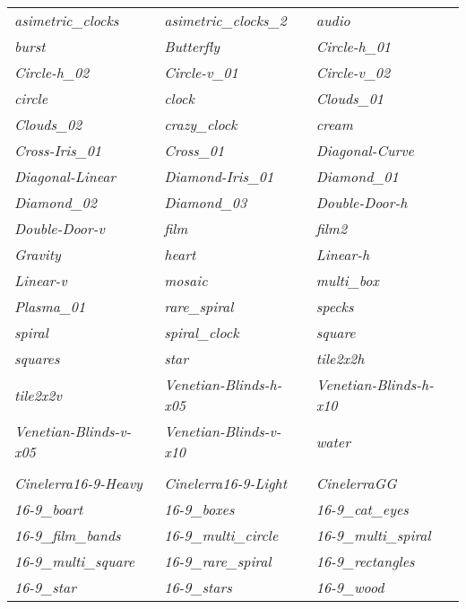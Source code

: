 \begin{center}
	\begin{longtable}{p{4cm}p{4cm}p{4cm}}
		\label{tabular:transitions}
		\textit{asimetric\_clocks} & \textit{asimetric\_clocks\_2} & \textit{audio} \\
		\textit{burst} & \textit{Butterfly} & \textit{Circle-h\_01} \\
		\textit{Circle-h\_02} & \textit{Circle-v\_01} & \textit{Circle-v\_02} \\
		\textit{circle} & \textit{clock} & \textit{Clouds\_01} \\
		\textit{Clouds\_02} & \textit{crazy\_clock} & \textit{cream} \\
		\textit{Cross-Iris\_01} & \textit{Cross\_01} & \textit{Diagonal-Curve} \\
		\textit{Diagonal-Linear} & \textit{Diamond-Iris\_01} & \textit{Diamond\_01} \\
		\textit{Diamond\_02} & \textit{Diamond\_03} & \textit{Double-Door-h} \\
		\textit{Double-Door-v} & \textit{film} & \textit{film2} \\
		\textit{Gravity} & \textit{heart} & \textit{Linear-h} \\
		\textit{Linear-v} & \textit{mosaic} & \textit{multi\_box} \\
		\textit{Plasma\_01} & \textit{rare\_spiral} & \textit{specks} \\
		\textit{spiral} & \textit{spiral\_clock} & \textit{square} \\
		\textit{squares} & \textit{star} & \textit{tile2x2h} \\
		\textit{tile2x2v} & \textit{Venetian-Blinds-h-x05} & \textit{Venetian-Blinds-h-x10} \\
		\textit{Venetian-Blinds-v-x05} & \textit{Venetian-Blinds-v-x10} & \textit{water} \\
\\
                \textit{Cinelerra16-9-Heavy} & \textit{Cinelerra16-9-Light} & \textit{CinelerraGG} \\
                \textit{16-9\_boart} & \textit{16-9\_boxes} & \textit{16-9\_cat\_eyes} \\
                \textit{16-9\_film\_bands} & \textit{16-9\_multi\_circle} & \textit{16-9\_multi\_spiral} \\
                \textit{16-9\_multi\_square} & \textit{16-9\_rare\_spiral} & \textit{16-9\_rectangles} \\
                \textit{16-9\_star} & \textit{16-9\_stars} & \textit{16-9\_wood} \\

		\bottomrule
	\end{longtable}
\end{center}
